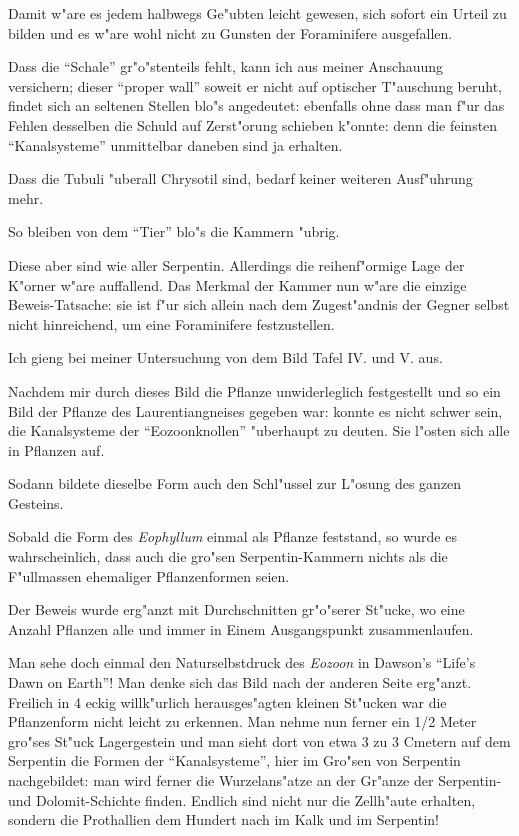 \documentclass[a4paper, 11pt, oneside, german]{article}
\begin{document}
Damit w"are es jedem halbwegs Ge"ubten leicht gewesen, sich sofort ein Urteil zu bilden und es w"are wohl nicht zu Gunsten der Foraminifere ausgefallen.

Dass die "`Schale"' gr"o"stenteils fehlt, kann ich aus meiner Anschauung versichern; dieser "`proper wall"' soweit er nicht auf optischer T"auschung beruht, findet sich an seltenen Stellen blo"s angedeutet: ebenfalls ohne dass man f"ur das Fehlen desselben die Schuld auf Zerst"orung schieben k"onnte: denn die feinsten "`Kanalsysteme"' unmittelbar daneben sind ja erhalten.

Dass die Tubuli "uberall Chrysotil sind, bedarf keiner weiteren Ausf"uhrung mehr.

So bleiben von dem "`Tier"' blo"s die Kammern "ubrig.

Diese aber sind wie aller Serpentin. Allerdings die reihenf"ormige Lage der K"orner w"are auffallend. Das Merkmal der Kammer nun w"are die einzige Beweis-Tatsache: sie ist f"ur sich allein nach dem Zugest"andnis der Gegner selbst nicht hinreichend, um eine Foraminifere festzustellen.

Ich gieng bei meiner Untersuchung von dem Bild Tafel IV. und V. aus.

Nachdem mir durch dieses Bild die Pflanze unwiderleglich festgestellt und so ein Bild der Pflanze des Laurentiangneises gegeben war: konnte es nicht schwer sein, die Kanalsysteme der "`Eozoonknollen"' "uberhaupt zu deuten. Sie l"osten sich alle in Pflanzen auf.

Sodann bildete dieselbe Form auch den Schl"ussel zur L"osung des ganzen Gesteins.

Sobald die Form des \emph{Eophyllum} einmal als Pflanze feststand, so wurde es wahrscheinlich, dass auch die gro"sen Serpentin-Kammern nichts als die F"ullmassen ehemaliger Pflanzenformen seien.

Der Beweis wurde erg"anzt mit Durchschnitten gr"o"serer St"ucke, wo eine Anzahl Pflanzen alle und immer in Einem Ausgangspunkt zusammenlaufen.

Man sehe doch einmal den Naturselbstdruck des \emph{Eozoon} in Dawson's "`Life's Dawn on Earth"'! Man denke sich das Bild nach der anderen Seite erg"anzt. Freilich in 4 eckig willk"urlich herausges"agten kleinen St"ucken war die Pflanzenform nicht leicht zu erkennen. Man nehme nun ferner ein 1/2 Meter gro"ses St"uck Lagergestein und man sieht dort von etwa 3 zu 3 Cmetern auf dem Serpentin die Formen der "`Kanalsysteme"', hier im Gro"sen von Serpentin nachgebildet: man wird ferner die Wurzelans"atze an der Gr"anze der Serpentin- und Dolomit-Schichte finden. Endlich sind nicht nur die Zellh"aute erhalten, sondern die Prothallien dem Hundert nach im Kalk und im Serpentin!
\end{document}
